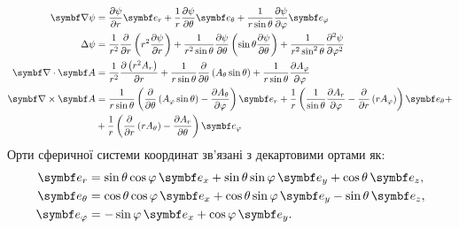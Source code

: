 \begin{align}\label{spheric}
    \vect{\nabla}\psi & = \frac{\partial \psi}{\partial r} \vect{e}_{r} + \frac{1}{r}\frac{\partial \psi}{\partial \theta} \vect{e}_{\theta} + \frac{1}{r\sin\theta}\frac{\partial \psi}{\partial \phi} \vect{e}_{\phi}                                                                                                            \\
	\Laplasian\psi    & = \frac{1}{r^2} \frac{\partial}{\partial r} \left( r^2 \frac{\partial \psi}{\partial r} \right) + \frac{1}{r^2 \sin \theta} \frac{\partial \psi}{\partial \theta} \left( \sin \theta \frac{\partial \psi}{\partial \theta} \right) + \frac{1}{r^2\sin^2 \theta} \frac{\partial^2 \psi}{\partial \phi^2} \\
	\divg\vect{A}     & =\frac{1}{r^2}\frac{\partial \left(r^2A_r\right)}{\partial r}
	+
	\frac{1}{r\sin \theta }\frac{\partial}{\partial \theta }\left(A_{\theta }\sin \theta \right)
	+
	\frac{1}{r\sin\theta}\frac{\partial A_{\phi}}{\partial \phi }                                                                                                                                                                                                                                                            \\
	\rot\vect{A}      & = \frac{1}{r\sin \theta }\left(\frac{\partial}{\partial \theta }\left(A_{\phi }\sin \theta \right)-\frac{\partial A_{\theta }}{\partial \phi }\right)\vect{e}_{r}
	+
	\frac{1}{r}\left(\frac{1}{\sin \theta }\frac{\partial A_{r}}{\partial \phi }-\frac{\partial}{\partial r}\left(rA_{\phi }\right)\right)\vect{e}_{\theta}
	+ \nonumber                                                                                                                                                                                                                                                                                                                    \\
	                  & + \frac{1}{r}\left(\frac{\partial}{\partial r}\left(rA_{\theta }\right)-\frac{\partial A_{r}}{\partial \theta }\right)\vect{e}_{\phi}
\end{align}
Орти сферичної системи координат зв'язані з декартовими ортами як:
\begin{align}
    \vect{e}_r &= \sin\theta\cos\phi\, \vect{e}_x + \sin\theta\sin\phi\, \vect{e}_y + \cos\theta\, \vect{e}_z, \\
    \vect{e}_{\theta} &= \cos\theta\cos\phi\, \vect{e}_x + \cos\theta\sin\phi\, \vect{e}_y - \sin\theta\, \vect{e}_z, \\
    \vect{e}_{\phi} &= -\sin\phi\, \vect{e}_x + \cos\phi\, \vect{e}_y. \\
\end{align}



